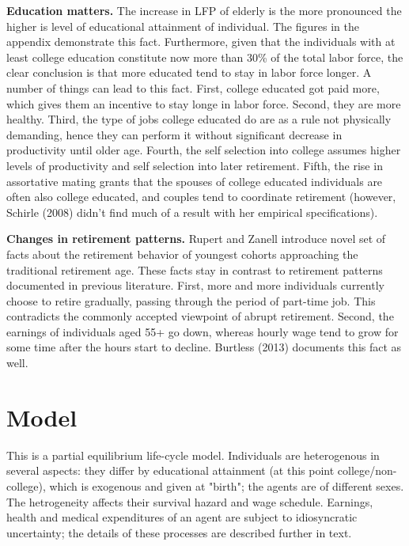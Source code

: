 \documentclass[
10pt, %
a4paper, %
oneside, %
headinclude,footinclude, %
BCOR5mm, %
]{scrartcl}
\begin{document}
\textbf{Education matters.} The increase in LFP of elderly is the more pronounced the higher is level of educational attainment of individual. The figures in the appendix demonstrate this fact. Furthermore, given that the individuals with at least college education constitute now more than 30\% of the total labor force, the clear conclusion is that more educated tend to stay in labor force longer. A number of things can lead to this fact. First, college educated got paid more, which gives them an incentive to stay longe in labor force. Second, they are more healthy. Third, the type of jobs college educated do are as a rule not physically demanding, hence they can perform it without significant decrease in productivity until older age. Fourth, the self selection into college assumes higher levels of productivity and self selection into later retirement. Fifth, the rise in assortative mating grants that the spouses of college educated individuals are often also college educated, and couples tend to coordinate retirement (however, Schirle (2008\cite{Schirle2008}) didn't find much of a result with her empirical specifications).

\textbf{Changes in retirement patterns.} Rupert and Zanell \cite{Rupert2015} introduce novel set of facts about the retirement behavior of youngest cohorts approaching the traditional retirement age. These facts stay in contrast to retirement patterns documented in previous literature. First, more and more individuals currently choose to retire gradually, passing through the period of part-time job. This contradicts the commonly accepted viewpoint of abrupt retirement. Second, the earnings of individuals aged 55+ go down, whereas hourly wage tend to grow for some time after the hours start to decline.  Burtless (2013) documents this fact as well.

\section{Model}
This is a partial equilibrium life-cycle model. Individuals are heterogenous in several aspects: they differ by educational attainment (at this point college/non-college), which is exogenous and given at "birth"; the agents are of different sexes. The hetrogeneity affects their survival hazard and wage schedule. Earnings, health and medical expenditures of an agent are subject to idiosyncratic uncertainty; the details of these processes are described further in text.
\end{document}
